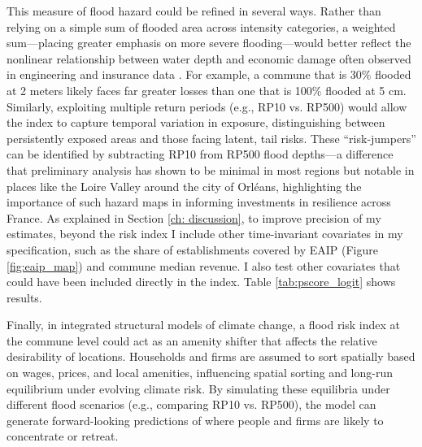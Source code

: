 This measure of flood hazard could be refined in several ways. Rather than relying on a simple sum of flooded area across intensity categories, a weighted sum—placing greater emphasis on more severe flooding—would better reflect the nonlinear relationship between water depth and economic damage often observed in engineering and insurance data \cite{ballocci2024econometric}. For example, a commune that is 30\% flooded at 2 meters likely faces far greater losses than one that is 100\% flooded at 5 cm. Similarly, exploiting multiple return periods (e.g., RP10 vs. RP500) would allow the index to capture temporal variation in exposure, distinguishing between persistently exposed areas and those facing latent, tail risks. These “risk-jumpers” can be identified by subtracting RP10 from RP500 flood depths—a difference that preliminary analysis has shown to be minimal in most regions but notable in places like the Loire Valley around the city of Orléans, highlighting the importance of such hazard maps in informing investments in resilience across France. As explained in Section \ref{ch: discussion}, to improve precision of my estimates, beyond the risk index I include other time-invariant covariates in my specification, such as the share of establishments covered by EAIP (Figure \ref{fig:eaip_map}) and commune median revenue. I also test other covariates that could have been included directly in the index. Table \ref{tab:pscore_logit} shows results.


Finally, in integrated structural models of climate change, a flood risk index at the commune level could act as an amenity shifter that affects the relative desirability of locations. Households and firms are assumed to sort spatially based on wages, prices, and local amenities, influencing spatial sorting and long-run equilibrium under evolving climate risk. By simulating these equilibria under different flood scenarios (e.g., comparing RP10 vs. RP500), the model can generate forward-looking predictions of where people and firms are likely to concentrate or retreat. %
\vspace{0.3cm}

